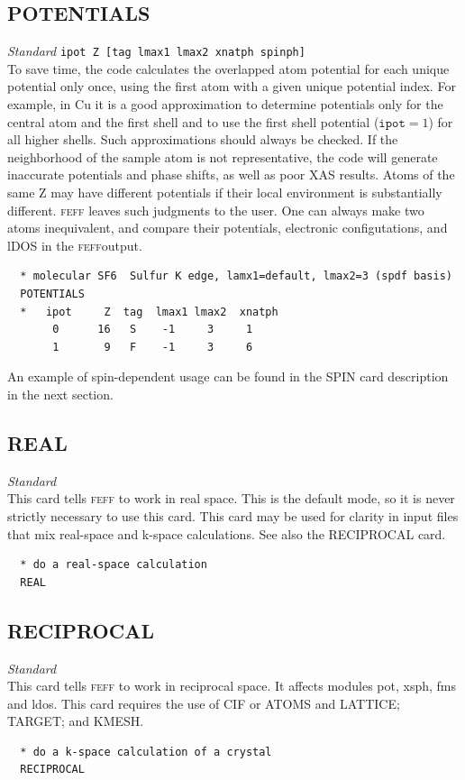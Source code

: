 \documentclass[11pt,oneside]{report} %
\newcommand{\program}[1]{\textsc{#1}}
\newcommand{\feff}{\program{feff}}
\newenvironment{Card}[4]%
      {\vspace{3ex}%
        \subsection{#1}
        \quad\textsl{#3}\newline
        \quad\texttt{#2}\newline%
        \label{card:#4}\\}
      {}
\begin{document}
\begin{Card}{POTENTIALS}{ipot   Z   [tag   lmax1   lmax2  xnatph  spinph]}{Standard}{pot}
  To save time, the code calculates the overlapped atom potential for
  each unique potential only once, using the first atom with a given unique 
  potential index.  For example, in Cu it is a good
  approximation to determine potentials only for the central atom and
  the first shell and to use the first shell potential
  ($\mathtt{ipot}=1$) for all higher shells.  Such approximations should
  always be checked.  If the neighborhood of the sample atom is not
  representative, the code will generate inaccurate potentials 
  and phase shifts, as well as poor XAS results.  Atoms of the same Z may have different potentials
  if their local environment is substantially different.  {\feff} leaves such judgments to the user.
  One can always make two atoms inequivalent, and compare their potentials, electronic configutations,
  and lDOS in the {\feff}output.

\begin{verbatim}
  * molecular SF6  Sulfur K edge, lamx1=default, lmax2=3 (spdf basis)
  POTENTIALS
  *   ipot     Z  tag  lmax1 lmax2  xnatph
       0      16   S    -1     3     1
       1       9   F    -1     3     6
\end{verbatim}
An example of spin-dependent usage can be found in the SPIN card description
in the next section.
\end{Card}



\begin{Card}{REAL}{}{Standard}{rea}
  This card tells {\feff} to work in real space.  This is the default mode, so it is never strictly necessary to use this card.  
  This card may be used for clarity in input files that mix
real-space and k-space calculations. See also the RECIPROCAL card.
\begin{verbatim}
  * do a real-space calculation
  REAL
\end{verbatim}
\end{Card}



\begin{Card}{RECIPROCAL}{}{Standard}{rec}
  This card tells {\feff} to work in reciprocal space.  It affects modules pot, xsph, fms and ldos.  This card requires
  the use of CIF or ATOMS and LATTICE; TARGET; and KMESH.
\begin{verbatim}
  * do a k-space calculation of a crystal
  RECIPROCAL
\end{verbatim}
\end{Card}
\end{document}
